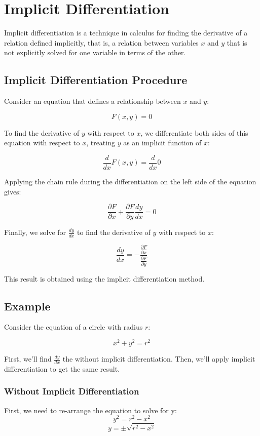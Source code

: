 \chapter{Implicit Differentiation}

Implicit differentiation is a technique in calculus for finding the
derivative of a relation defined implicitly, that is, a relation
between variables $x$ and $y$ that is not explicitly solved for one
variable in terms of the other.

\section{Implicit Differentiation Procedure}

Consider an equation that defines a relationship between $x$ and $y$:

\[
F(x, y) = 0
\]

To find the derivative of $y$ with respect to $x$, we differentiate
both sides of this equation with respect to $x$, treating $y$ as an
implicit function of $x$:

$$\frac{d}{dx} F(x, y) = \frac{d}{dx} 0$$

Applying the chain rule during the differentiation on the left side of
the equation gives:

$$\frac{\partial F}{\partial x} + \frac{\partial F}{\partial y} 
\frac{dy}{dx} = 0$$

Finally, we solve for $\frac{dy}{dx}$ to find the derivative of $y$
with respect to $x$:

$$\frac{dy}{dx} = 
-\frac{\frac{\partial F}{\partial x}}{\frac{\partial F}{\partial y}}$$

This result is obtained using the implicit differentiation method.

\section{Example}

Consider the equation of a circle with radius $r$:

$$x^2 + y^2 = r^2$$

First, we'll find $\frac{dy}{dx}$ the without implicit 
differentiation. Then, we'll apply implicit differentiation to get 
the same result. 

\subsection{Without Implicit Differentiation}
First, we need to re-arrange the equation to solve for y: $$y^2 = r^2 
- x^2$$
$$y = \pm \sqrt{r^2 - x^2}$$

